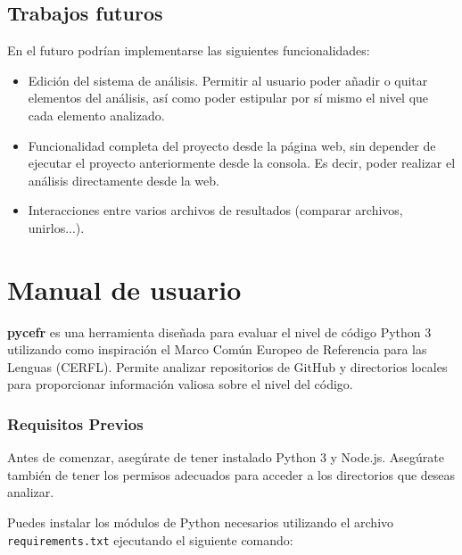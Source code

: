 \documentclass[a4paper, 12pt]{book}
\begin{document}
\section{Trabajos futuros}
\label{sec:trabajos_futuros}

En el futuro podrían implementarse las siguientes funcionalidades:

\begin{itemize}
    \item Edición del sistema de análisis. Permitir al usuario poder añadir o quitar elementos del análisis, así como poder estipular por sí mismo el nivel que cada elemento analizado.
    \item Funcionalidad completa del proyecto desde la página web, sin depender de ejecutar el proyecto anteriormente desde la consola. Es decir, poder realizar el análisis directamente desde la web.
    \item Interacciones entre varios archivos de resultados (comparar archivos, unirlos...). 
\end{itemize}



\cleardoublepage
\appendix
\chapter{Manual de usuario}
\label{app:manual}

\textbf{pycefr} es una herramienta diseñada para evaluar el nivel de código Python 3 utilizando como inspiración el Marco Común Europeo de Referencia para las Lenguas (CERFL). Permite analizar repositorios de GitHub y directorios locales para proporcionar información valiosa sobre el nivel del código.

\subsection{Requisitos Previos}
Antes de comenzar, asegúrate de tener instalado Python 3 y Node.js. Asegúrate también de tener los permisos adecuados para acceder a los directorios que deseas analizar.

Puedes instalar los módulos de Python necesarios utilizando el archivo \texttt{requirements.txt} ejecutando el siguiente comando:
\end{document}

